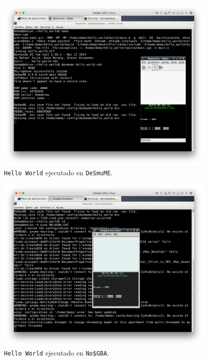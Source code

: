 \documentclass[12pt,english]{article}
\begin{document}
\begin{figure}[h!]
	\caption{{\tt Hello World} ejecutado en {\tt DeSmuME}.}
	\label{fig:dependency}
	\centering
	\includegraphics[width=0.95\textwidth]{P1Media/DeSmuME}
\end{figure}
	
\begin{figure}[h!]
	\caption{{\tt Hello World} ejecutado en {\tt No\$GBA}.}
	\label{fig:dependency}
	\centering
	\includegraphics[width=0.95\textwidth]{P1Media/NoCash}
\end{figure}
\end{document}

